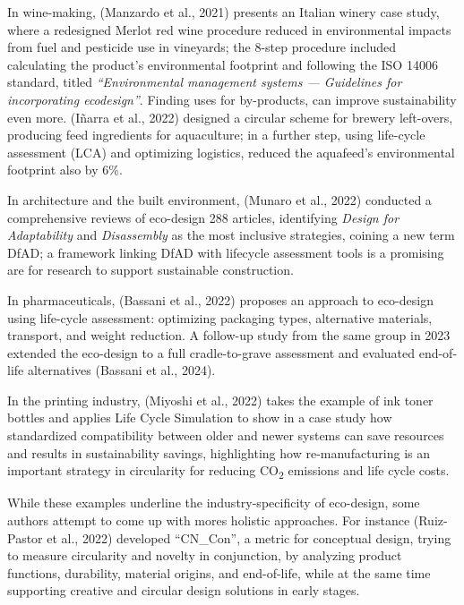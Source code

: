\documentclass[
  12pt,
  letterpaper,
  DIV=11,
  numbers=noendperiod]{scrartcl}
\begin{document}
In wine-making, (Manzardo et al., 2021) presents an Italian winery case
study, where a redesigned Merlot red wine procedure reduced in
environmental impacts from fuel and pesticide use in vineyards; the
8-step procedure included calculating the product's environmental
footprint and following the ISO 14006 standard, titled
\emph{``Environmental management systems --- Guidelines for
incorporating ecodesign''}. Finding uses for by-products, can improve
sustainability even more. (Iñarra et al., 2022) designed a circular
scheme for brewery left-overs, producing feed ingredients for
aquaculture; in a further step, using life-cycle assessment (LCA) and
optimizing logistics, reduced the aquafeed's environmental footprint
also by 6\%.

In architecture and the built environment, (Munaro et al., 2022)
conducted a comprehensive reviews of eco-design 288 articles,
identifying \emph{Design for Adaptability} and \emph{Disassembly} as the
most inclusive strategies, coining a new term DfAD; a framework linking
DfAD with lifecycle assessment tools is a promising are for research to
support sustainable construction.

In pharmaceuticals, (Bassani et al., 2022) proposes an approach to
eco-design using life-cycle assessment: optimizing packaging types,
alternative materials, transport, and weight reduction. A follow-up
study from the same group in 2023 extended the eco-design to a full
cradle-to-grave assessment and evaluated end-of-life alternatives
(Bassani et al., 2024).

In the printing industry, (Miyoshi et al., 2022) takes the example of
ink toner bottles and applies Life Cycle Simulation to show in a case
study how standardized compatibility between older and newer systems can
save resources and results in sustainability savings, highlighting how
re-manufacturing is an important strategy in circularity for reducing
CO\textsubscript{2} emissions and life cycle costs.

While these examples underline the industry-specificity of eco-design,
some authors attempt to come up with mores holistic approaches. For
instance (Ruiz-Pastor et al., 2022) developed ``CN\_Con'', a metric for
conceptual design, trying to measure circularity and novelty in
conjunction, by analyzing product functions, durability, material
origins, and end-of-life, while at the same time supporting creative and
circular design solutions in early stages.
\end{document}
